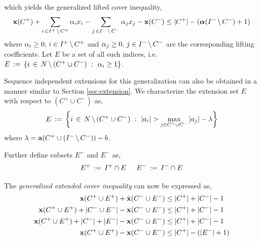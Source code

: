 \documentclass[10pt,twoside]{amsart}
\begin{document}
which yields the generalized lifted cover inequality,
\begin{align}
\label{ineq:genliftedcover}
    \mathbf{x}(C^+) + \sum_{i\,\in I^+\,\backslash\, C^+} \alpha_i x_i - \sum_{j\,\in I^-\,\backslash\, C^-} \alpha_j x_j - \mathbf{x}(C^-) \leq |C^+| - (\boldsymbol\alpha(I^-\,\backslash\, C^-) + 1)
\end{align}
where $\alpha_i \geq 0,\,i\in I^+\,\backslash\, C^+$ and $\alpha_j \geq 0,\,j\in I^-\,\backslash\, C^-$ are the corresponding lifting coefficients. Let $E$ be a set of all such indices, i.e. $E \,:=\, \left\{ {i\,\in\, N\,\backslash\, (C^+ \cup C^-)} \ : \ {\alpha_i \geq 1} \right\}$.


Sequence independent extensions for this generalization can also be obtained in a manner similar to Section \ref{sec:extension}. We characterize the extension set $E$ with respect to $(C^+ \cup C^-)$ as,
\begin{align}
\label{set:extplus}
    E \,:=\, \left\{ {i\,\in\, N\,\backslash\, (C^+\cup C^-)} \ : \ {|a_i| > \underset{j\in C^+\cup C^-}{\max}\, |a_j| - \lambda} \right\}
\end{align}
where $\lambda = \mathbf{a}(C^+\cup (I^-\,\backslash\, C^-)) - b$.

Further define subsets $E^+$ and $E^-$ as,
\begin{align*}
  E^+ \,:=\, I^+ \cap E \hspace{5mm} E^- \,:=\, I^- \cap E
\end{align*}

The \emph{generalized extended cover inequality} can now be expressed as,
\begin{align*}
        \mathbf{x}(C^+\cup E^+) + \bar{\mathbf{x}}(C^-\cup E^-) & \leq |C^+| + |C^-| - 1\\
        \mathbf{x}(C^+\cup E^+) + |C^-\cup E^-| - \mathbf{x}(C^-\cup E^-) & \leq |C^+| + |C^-| - 1\\
        \mathbf{x}(C^+\cup E^+) + |C^-| + |E^-| - \mathbf{x}(C^-\cup E^-) & \leq |C^+| + |C^-| - 1\\
        \mathbf{x}(C^+\cup E^+) - \mathbf{x}(C^-\cup E^-) & \leq |C^+| - (|E^-| + 1)
\end{align*}
\end{document}
